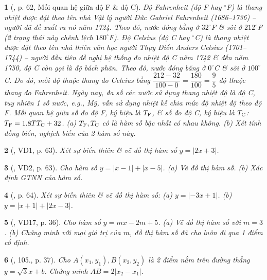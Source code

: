 \documentclass{article}
\newtheorem{baitoan}{}
\begin{document}
\begin{baitoan}[\cite{Binh_boi_duong_Toan_9_tap_1}, p. 62, Mối quan hệ giữa độ F \& độ C]
	Độ Fahrenheit (độ {\rm F} hay ${}^\circ${\rm F}) là thang nhiệt được đặt theo tên nhà Vật lý người Đức Gabriel Fahrenheit (1686--1736) -- người đã đề xuất ra nó năm 1724. Theo đó, nước đóng bằng ở $32^\circ${\rm F} \& sôi ở $212^\circ${\rm F} (2 trạng thái này chênh lệch $180^\circ${\rm F}). Độ Celsius (độ {\rm C} hay ${}^\circ${\rm C}) là thang nhiệt được đặt theo tên nhà thiên văn học người Thụy Điển Anders Celsius (1701--1744) -- người đầu tiên đề nghị hệ thống đo nhiệt độ {\rm C} năm 1742 \& đến năm 1750, độ {\rm C} còn gọi là độ bách phân. Theo đó, nước đóng băng ở $0^\circ${\rm C} \& sôi ở $100^\circ${\rm C}. Do đó, mỗi độ thuộc thang đo Celcius bằng $\dfrac{212 - 32}{100 - 0} = \dfrac{180}{100} = \dfrac{9}{5}$ độ thuộc thang đo Fahrenheit. Ngày nay, đa số các nước sử dụng thang nhiệt độ là độ {\rm C}, tuy nhiên 1 số nước, e.g., Mỹ, vẫn sử dụng nhiệt kế chia mức độ nhiệt độ theo độ {\rm F}. Mối quan hệ giữa số đo độ {\rm F}, ký hiệu là $T_{\rm F}$, \& số đo độ {\rm C}, ký hiệu là $T_{\rm C}$: $T_{\rm F} = 1.8TT_{\rm C} + 32$. (a) $T_{\rm F},T_{\rm C}$ có là hàm số bậc nhất có nhau không. (b) Xét tính đồng biến, nghịch biến của 2 hàm số này.
\end{baitoan}

\begin{baitoan}[\cite{Binh_boi_duong_Toan_9_tap_1}, VD1, p. 63]
	Xét sự biến thiên \& vẽ đồ thị hàm số $y = |2x + 3|$.
\end{baitoan}

\begin{baitoan}[\cite{Binh_boi_duong_Toan_9_tap_1}, VD2, p. 63]
	Cho hàm số $y = |x - 1| + |x - 5|$. (a) Vẽ đồ thị hàm số. (b) Xác định {\rm GTNN} của hàm số.
\end{baitoan}

\begin{baitoan}[\cite{Binh_boi_duong_Toan_9_tap_1}, p. 64]
	Xét sự biến thiên \& vẽ đồ thị hàm số: (a) $y = |-3x + 1|$. (b) $y = |x + 1| + |2x - 3|$.
\end{baitoan}

\begin{baitoan}[\cite{Tuyen_Toan_9_old}, VD17, p. 36]
	Cho hàm số $y = mx - 2m + 5$. (a) Vẽ đồ thị hàm số với $m = 3$. (b) Chứng minh với mọi giá trị của $m$, đồ thị hàm số đã cho luôn đi qua 1 điểm cố định.
\end{baitoan}

\begin{baitoan}[\cite{Tuyen_Toan_9_old}, 105., p. 37]
	Cho $A(x_1,y_1),B(x_2,y_2)$ là 2 điểm nằm trên đường thẳng $y = \sqrt{3}x + b$. Chứng minh $AB = 2|x_2 - x_1|$.
\end{baitoan}
\end{document}

